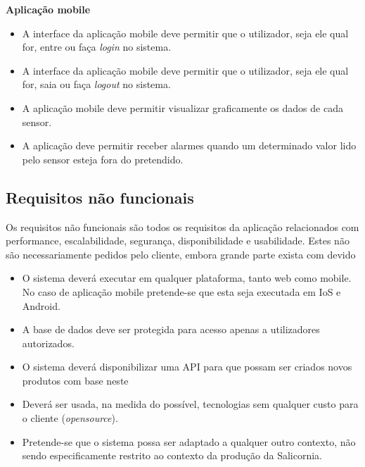 \textbf{Aplicação mobile}



\begin{itemize}
	\item A interface da aplicação mobile deve permitir que o utilizador, seja ele qual for, entre ou faça \textit{login} no sistema. 
	
	\item A interface da aplicação mobile deve permitir que o utilizador, seja ele qual for, saia ou faça \textit{logout} no sistema.
	
	
	\item A aplicação mobile deve permitir visualizar graficamente os dados de cada sensor. 
	
	\item  A aplicação deve permitir receber alarmes quando um determinado valor lido pelo sensor esteja fora do pretendido.
	
	
\end{itemize}



\subsection{Requisitos não funcionais}


Os requisitos não funcionais são todos os requisitos da aplicação relacionados com performance, escalabilidade, segurança, disponibilidade e usabilidade. Estes não são necessariamente pedidos pelo cliente, embora grande parte exista com devido 


\begin{itemize}
	\item O sistema deverá executar em qualquer plataforma, tanto web como mobile. No caso de aplicação mobile pretende-se que esta seja executada em IoS e Android.  
	
	
	\item A base de dados deve ser protegida para acesso apenas a utilizadores autorizados. 
		
	
	\item O sistema deverá disponibilizar uma API para que possam ser criados novos produtos com base neste 
	
	\item Deverá ser usada, na medida do possível, tecnologias sem qualquer custo para o cliente (\textit{opensource}). 
	
	\item Pretende-se que o sistema possa ser adaptado a qualquer outro contexto, não sendo especificamente restrito ao contexto da produção da Salicornia.  
		
\end{itemize}



